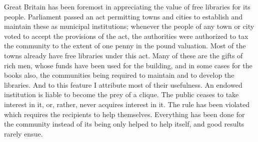 \documentclass[11pt,openany]{book}
\begin{document}
Great Britain has been foremost in appreciating the value of free libraries for its people. Parliament passed an act permitting towns and cities to establish and maintain these as municipal institutions; whenever the people of any town or city voted to accept the provisions of the act, the authorities were authorized to tax the community to the extent of one penny in the pound valuation. Most of the towns already have free libraries under this act. Many of these are the gifts of rich men, whose funds have been used for the building, and in some cases for the books also, the communities being required to maintain and to develop the libraries. And to this feature I attribute most of their usefulness. An endowed institution is liable to become the prey of a clique. The public ceases to take interest in it, or, rather, never acquires interest in it. The rule has been violated which requires the recipients to help themselves. Everything has been done for the community instead of its being only helped to help itself, and good results rarely ensue.
\end{document}
